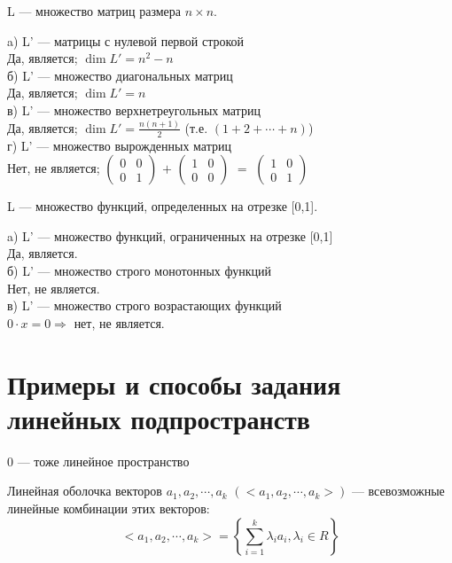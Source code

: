 \begin{prim}
	L --- множество матриц размера $n \times n$.
\end{prim}
a) L' --- матрицы с нулевой первой строкой\\
Да, является;  $\dim  L'=n^2-n$\\
б) L' --- множество диагональных матриц\\
Да, является;  $\dim  L'=n$\\
в) L' --- множество верхнетреугольных матриц\\
Да, является;  $\dim  L'=\frac{n(n+1)}{2}$   (т.е. $(1+2+\cdots +n)$) \\
г) L' --- множество вырожденных матриц\\
Нет, не является;
$\left( %
\begin{smallmatrix}
0&0 \\
0&1 
\end{smallmatrix} 
\right)$  
$+$
$\left(
\begin{smallmatrix}
1&0 \\
0&0 
\end{smallmatrix} 
\right)$  
$=$
$\left(
\begin{smallmatrix}
1&0 \\
0&1 
\end{smallmatrix} 
\right)$  
\\

\begin{prim}
	L --- множество функций, определенных на отрезке [0,1].
\end{prim}
a) L' --- множество функций, ограниченных на отрезке [0,1]\\
Да, является. \\
б) L' --- множество строго монотонных функций\\
Нет, не является. \\
в) L' --- множество строго возрастающих функций\\
$0\cdot x = 0 \Longrightarrow$ нет, не является. \\

\section{Примеры и способы задания линейных подпространств}

0 --- тоже линейное пространство
\begin{definition}
	Линейная оболочка векторов $a_1, a_2, \cdots , a_k$  $(<a_1, a_2, \cdots , a_k>)$ --- всевозможные линейные комбинации этих векторов:
	$$<a_1, a_2, \cdots , a_k>=\left\{ \sum\limits^k _{i= 1} \lambda_i  a_i  , \lambda_i \in R \right\}$$ 
\end{definition}

